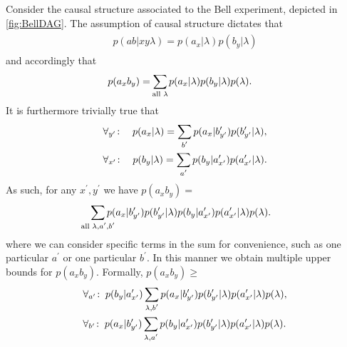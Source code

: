 Consider the causal structure associated to the Bell experiment, depicted in \cref{fig:BellDAG}. 
The assumption of causal structure dictates that
\begin{align}\begin{split}\label{eq:bellstructure}
p(ab|xy\lambda)=p(a_x|\lambda)p(b_y|\lambda)
\end{split}\end{align}
and accordingly that
\begin{align}\begin{split}\label{eq:bellintegration}
&p(a_x b_y)=\sum\limits_{\mathclap{\text{all }\lambda}}p(a_x|\lambda)p(b_y|\lambda)p(\lambda).
\end{split}\end{align}
It is furthermore trivially true that
\begin{align}\begin{split}\label{eq:hardytoproductsums}
&\forall_{y^{\prime}}\!:\quad p(a_x|\lambda)=\sum\limits_{\mathclap{b^{\prime}}}p(a_x|b^{\prime}_{y^{\prime}})p(b^{\prime}_{y^{\prime}}|\lambda),\\
&\forall_{x^{\prime}}\!:\quad p(b_y|\lambda)=\sum\limits_{\mathclap{a^{\prime}}}p(b_y|a^{\prime}_{x^{\prime}})p(a^{\prime}_{x^{\prime}}|\lambda).
\end{split}\end{align}
As such, for any $x^{\prime},y^{\prime}$ we have $p(a_x b_y)=$
\begin{align}\begin{split}
&\sum\limits_{\mathclap{\text{all }\lambda,a^{\prime},b^{\prime}}}p(a_x|b^{\prime}_{y^{\prime}})p(b^{\prime}_{y^{\prime}}|\lambda)p(b_y|a^{\prime}_{x^{\prime}})p(a^{\prime}_{x^{\prime}}|\lambda)p(\lambda).
\end{split}\end{align}
where we can consider specific terms in the sum for convenience, such as one particular $a^{\prime}$ or one particular $b^{\prime}$. In this manner we obtain multiple upper bounds for $p(a_x b_y)$. Formally, $p(a_x b_y)\geq$
\begin{align}\begin{split}\label{eq:doublesums} 
&\forall_{a^{\prime}}\!:\;p(b_y|a^{\prime}_{x^{\prime}})\sum\limits_{\mathclap{\lambda,b^{\prime}}}p(a_x|b^{\prime}_{y^{\prime}})p(b^{\prime}_{y^{\prime}}|\lambda)p(a^{\prime}_{x^{\prime}}|\lambda)p(\lambda),\\
&\forall_{b^{\prime}}\!:\;p(a_x|b^{\prime}_{y^{\prime}})\sum\limits_{\mathclap{\lambda,a^{\prime}}}p(b_y|a^{\prime}_{x^{\prime}})p(b^{\prime}_{y^{\prime}}|\lambda)p(a^{\prime}_{x^{\prime}}|\lambda)p(\lambda).
\end{split}\end{align}
